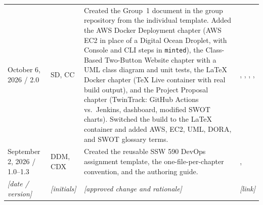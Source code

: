 \begin{tabularx}{\linewidth}{L{3.1cm}L{2.2cm}YL{2.0cm}}
October 6, 2026 / 2.0 & SD, CC & Created the Group~1 document in the group repository from the individual template. Added the AWS Docker Deployment chapter (AWS EC2 in place of a Digital Ocean Droplet, with Console and CLI steps in \texttt{minted}), the Class-Based Two-Button Website chapter with a UML class diagram and unit tests, the LaTeX Docker chapter (TeX Live container with real build output), and the Project Proposal chapter (TwinTrack: GitHub Actions vs.\ Jenkins, dashboard, modified SWOT charts). Switched the build to the LaTeX container and added AWS, EC2, UML, DORA, and SWOT glossary terms. & , , , , \\
September 2, 2026 / 1.0--1.3 & DDM, CDX & Created the reusable SSW 590 DevOps assignment template, the one-file-per-chapter convention, and the authoring guide. & , \\
\textit{[date / version]} & \textit{[initials]} & \textit{[approved change and rationale]} & \textit{[link]}\\
\end{tabularx}
